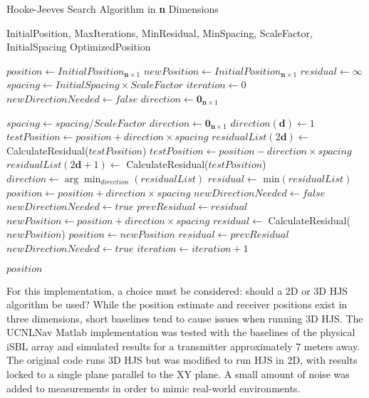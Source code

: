 \documentclass[11pt]{ucthesisCP}
\begin{document}
\begin{algorithm}
	\ssp
	\caption{Hooke-Jeeves Search Algorithm in \textbf{n} Dimensions} \label{alg:hooke-jeeves-3d}
	\begin{algorithmic}[1]
		\Require InitialPosition, MaxIterations, MinResidual, MinSpacing, ScaleFactor, InitialSpacing
		\Ensure OptimizedPosition
		
		\State $position \gets InitialPosition_{\mathbf{n} \times 1}$
		\State $newPosition \gets InitialPosition_{\mathbf{n} \times 1}$
		\State $residual \gets \infty$
		\State $spacing \gets InitialSpacing \times ScaleFactor$
		\State $iteration \gets 0$
		\State $newDirectionNeeded \gets false$
		\State $direction \gets \mathbf{0}_{\mathbf{n} \times 1}$
		
		\State $spacing \gets spacing / ScaleFactor$
		\State $direction \gets \mathbf{0}_{\mathbf{n} \times 1}$
		\State $direction(\mathbf{d}) \gets 1$
		\State $testPosition \gets position + direction \times spacing$
		\State $residualList(2\mathbf{d}) \gets$ CalculateResidual($testPosition$)
		\State $testPosition \gets position - direction \times spacing$
		\State $residualList(2\mathbf{d}+1) \gets$ CalculateResidual($testPosition$)
		\EndFor
		\State $direction \gets \arg\!\min_{direction}(residualList)$
		\State $residual \gets$ min$(residualList)$
		\State $position \gets position + direction \times spacing$
		\State $newDirectionNeeded \gets false$
		\Else
		\State $newDirectionNeeded \gets true$
		\EndIf
		\Else
		\State $prevResidual \gets residual$
		\State $newPosition \gets position + direction \times spacing$
		\State $residual \gets$ CalculateResidual($newPosition$)
		\State $position \gets newPosition$
		\Else
		\State $residual \gets prevResidual$
		\State $newDirectionNeeded \gets true$
		\EndIf
		\EndIf
		\State $iteration \gets iteration + 1$
		\EndWhile
		
		\Return $position$
	\end{algorithmic}
\end{algorithm}

For this implementation, a choice must be considered: should a 2D or 3D HJS algorithm be used? While the position estimate and receiver positions exist in three dimensions, short baselines tend to cause issues when running 3D HJS. The UCNLNav Matlab implementation was tested with the baselines of the physical iSBL array and simulated results for a transmitter approximately 7 meters away. The original code runs 3D HJS but was modified to run HJS in 2D, with results locked to a single plane parallel to the XY plane. A small amount of noise was added to measurements in order to mimic real-world environments. 
\end{document}
